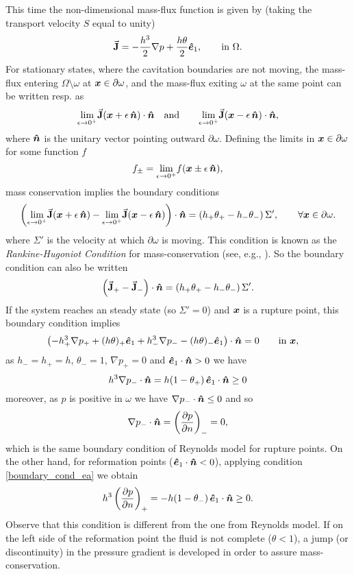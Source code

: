 This time the non-dimensional mass-flux function is given by (taking the transport velocity $S$ equal to unity)
\begin{equation}
\vec{\mathbf{J}}=-\frac{h^3}{2}\nabla p+\frac{h\theta}{2}\boldsymbol{\hat{e}}_1,\qquad
\text{in } \Omega.
\end{equation}
For stationary states, where the cavitation boundaries are not moving, the mass-flux entering $\Omega\setminus\omega$ at $\boldsymbol{x}\in \partial\omega$, and the mass-flux exiting $\omega$ at the same point can be written resp. as
$$\underset{\epsilon \rightarrow 0^+}{\lim } \vec{\mathbf{J}}(\boldsymbol{x}+\epsilon\,\boldsymbol{\hat{n}})\cdot \boldsymbol{\hat{n}}\quad \text{and}\qquad \underset{\epsilon \rightarrow 0^+}{\lim } \vec{\mathbf{J}}(\boldsymbol{x}-\epsilon\,\boldsymbol{\hat{n}})\cdot \boldsymbol{\hat{n}},$$
where $\boldsymbol{\hat{n}}$ is the unitary vector pointing outward $\partial\omega$. Defining the limits in $\boldsymbol{x}\in \partial \omega$ for some function $f$ $$f_\pm=\underset{\epsilon \rightarrow 0^+}{\lim } f(\boldsymbol{x}\pm\epsilon\,\boldsymbol{\hat{n}}),$$
mass conservation implies the boundary conditions
$$
\left(\underset{\epsilon \rightarrow 0^+}{\lim } \vec{\mathbf{J}}(\boldsymbol{x}+\epsilon\,\boldsymbol{\hat{n}})-\underset{\epsilon \rightarrow 0^+}{\lim } \vec{\mathbf{J}}(\boldsymbol{x}-\epsilon\,\boldsymbol{\hat{n}})\right) \cdot \boldsymbol{\hat{n}}=\left(h_+\theta_+-h_-\theta_-\right)\Sigma',\qquad\forall \boldsymbol{x}\in \partial\omega.
$$
where $\Sigma'$ is the velocity at which $\partial\omega$ is moving. This condition is known as the \emph{Rankine-Hugoniot Condition} for mass-conservation (see, e.g., \cite{leveque2002}). So the boundary condition can also be written
\begin{equation}
\left( \veca{J}_+ - \veca{J}_- \right) \cdot \bds{\hat{n}}=\left(h_+\theta_+-h_-\theta_-\right)\Sigma'.\label{eq:boundary_cond_ea}
\end{equation}
If the system reaches an steady state (so $\Sigma'=0$) and $\boldsymbol{x}$ is a rupture point, this boundary condition implies
\begin{align*}
\left(-h^3_+\nabla p_++ (h\theta)_+ \boldsymbol{\hat{e}}_1 + h_-^3\nabla p_--(h\theta)_-\boldsymbol{\hat{e}}_1\right)\cdot \boldsymbol{\hat{n}}&=0\qquad \text{in }\boldsymbol{x},
\end{align*}
as $h_-=h_+=h$, $\theta_-=1$, $\nabla p _+=0$ and $\boldsymbol{\hat{e}}_1\cdot \boldsymbol{\hat{n}}>0$ we have $$h^3\nabla p_-\cdot \boldsymbol{\hat{n}} = h(1-\theta_+)\,\boldsymbol{\hat{e}}_1\cdot\boldsymbol{\hat{n}}\geq 0$$
moreover, as $p$ is positive in $\omega$ we have $\nabla p_-\cdot \boldsymbol{\hat{n}}\leq 0$ and so
$$\nabla p_-\cdot\boldsymbol{\hat{n}}=\left(\frac{\partial p}{\partial n}\right)_-=0,$$
which is the same boundary condition of Reynolds model for rupture points. On the other hand, for reformation points ($\boldsymbol{\hat{e}}_1\cdot \boldsymbol{\hat{n}}<0$), applying condition \eqref*{boundary_cond_ea} we obtain
$$h^3\left(\frac{\partial p}{\partial n}\right)_+=-h(1-\theta_-)\,\boldsymbol{\hat{e}}_1\cdot \boldsymbol{\hat{n}}\geq 0.$$
Observe that this condition is different from the one from Reynolds model. If on the left side of the reformation point the fluid is not complete ($\theta<1$), a jump (or discontinuity) in the pressure gradient is developed in order to assure mass-conservation.

